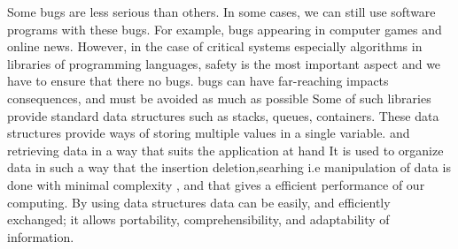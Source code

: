 %
%
%

Some bugs are less serious than others. In some cases, we can still use software programs with these bugs. For example, bugs appearing in computer games and online news.
However, in the case of critical systems 
especially algorithms  in libraries of programming languages, safety is the most important aspect and we have to ensure that there no bugs.
{bugs can have far-reaching impacts consequences, and must be avoided as much as possible}
Some of such libraries provide standard data structures such as stacks, queues, containers. These  data structures provide ways of storing multiple values in a single variable.
{and retrieving data in a way that suits the application at hand}
It is used to organize data in such a way that the insertion deletion,searhing i.e manipulation of data is done with minimal complexity , and that gives a efficient performance of our computing. 
By using data structures data can be easily, and efficiently exchanged; it allows portability, comprehensibility, and adaptability of information.

